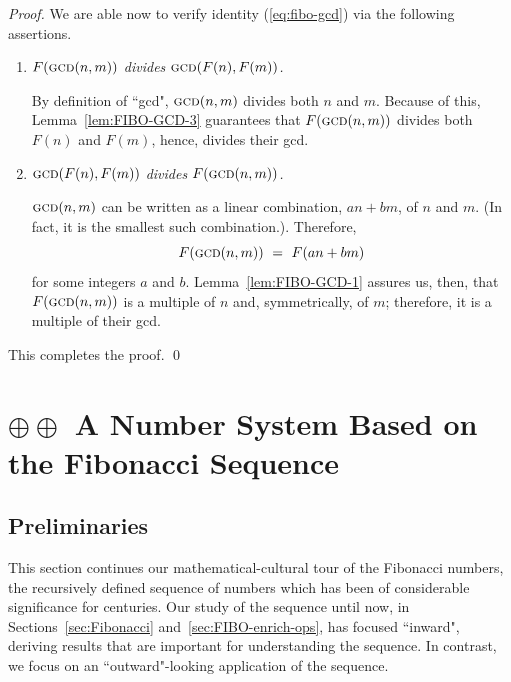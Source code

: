 \begin{proof}
\medskip

\noindent
We are able now to verify identity (\ref{eq:fibo-gcd}) via the following assertions.

\medskip

\begin{enumerate}
\item
{\em $F(\mbox{\sc gcd}(n,m))$ divides $\mbox{\sc gcd}(F(n), F(m))$.}

\smallskip

By definition of ``{\sc gcd}", $\mbox{\sc gcd}(n,m)$ divides both $n$ and $m$.  Because of this,
Lemma~\ref{lem:FIBO-GCD-3} guarantees that $F(\mbox{\sc gcd}(n,m))$ divides both $F(n)$ and $F(m)$, hence, divides their {\sc gcd}.

\medskip

\item
{\em $\mbox{\sc gcd}(F(n), F(m))$ divides $F(\mbox{\sc gcd}(n,m))$.}

\smallskip

$\mbox{\sc gcd}(n,m)$ can be written as a linear combination, $a n + b m$, of $n$ and $m$.  (In fact, it is the smallest such combination.). Therefore, 
\[ F(\mbox{\sc gcd}(n,m)) \ = \ F(a n + b m) \]
for some integers $a$ and $b$.  Lemma~\ref{lem:FIBO-GCD-1} assures us, then, that
$F(\mbox{\sc gcd}(n,m))$ is a multiple of $n$ and, symmetrically, of $m$; therefore, it is a multiple of their {\sc gcd}. 
\end{enumerate}
This completes the proof.   \qed
\end{proof}


\section{$\oplus \oplus$ A Number System Based on the Fibonacci Sequence}
\label{sec:numerals-special-families}
\label{sec:Fibo-numbers}

\subsection{Preliminaries}
\label{sec:FIBO-num-intro}

This section continues our mathematical-cultural tour of the Fibonacci numbers, the recursively defined sequence of numbers which has been of considerable significance for centuries.  Our study of the sequence until now, in Sections~\ref{sec:Fibonacci} and~\ref{sec:FIBO-enrich-ops}, has focused ``inward", deriving results that are important for understanding the sequence.  In contrast, we focus on an ``outward"-looking application of the sequence.

